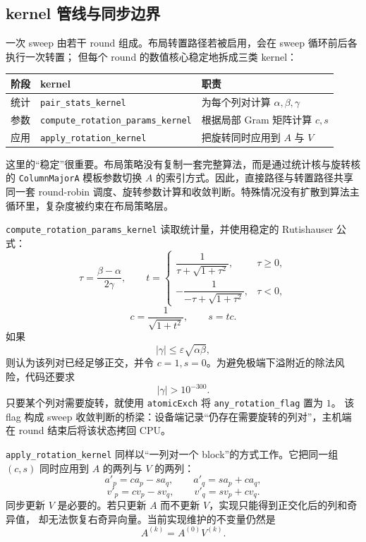 \subsection{kernel 管线与同步边界}

一次 sweep 由若干 round 组成。布局转置路径若被启用，会在 sweep 循环前后各执行一次转置；
但每个 round 的数值核心稳定地拆成三类 kernel：

\begin{table}[htbp]
    \centering
    \begin{tabular}{lll}
        \toprule
        阶段 & kernel                                     & 职责                              \\
        \midrule
        统计 & \texttt{pair\_stats\_kernel}               & 为每个列对计算 \(\alpha,\beta,\gamma\) \\
        参数 & \texttt{compute\_rotation\_params\_kernel} & 根据局部 Gram 矩阵计算 \(c,s\)          \\
        应用 & \texttt{apply\_rotation\_kernel}           & 把旋转同时应用到 \(A\) 与 \(V\)          \\
        \bottomrule
    \end{tabular}
\end{table}

这里的“稳定”很重要。布局策略没有复制一套完整算法，而是通过统计核与旋转核的
\texttt{ColumnMajorA} 模板参数切换 \(A\) 的索引方式。因此，直接路径与转置路径共享同一套
round-robin 调度、旋转参数计算和收敛判断。特殊情况没有扩散到算法主循环里，复杂度被约束在布局策略层。

\texttt{compute\_rotation\_params\_kernel} 读取统计量，并使用稳定的 Rutishauser 公式：
\[
    \tau=\frac{\beta-\alpha}{2\gamma},\qquad
    t =
    \begin{cases}
        \dfrac{1}{\tau+\sqrt{1+\tau^2}},   & \tau\ge0, \\[1.2em]
        -\dfrac{1}{-\tau+\sqrt{1+\tau^2}}, & \tau<0,
    \end{cases}
\]
\[
    c=\frac{1}{\sqrt{1+t^2}},\qquad s=tc.
\]
如果
\[
    |\gamma|\le \varepsilon\sqrt{\alpha\beta},
\]
则认为该列对已经足够正交，并令 \(c=1,s=0\)。为避免极端下溢附近的除法风险，代码还要求
\[
    |\gamma|>10^{-300}.
\]
只要某个列对需要旋转，就使用 \texttt{atomicExch} 将 \texttt{any\_rotation\_flag} 置为 \(1\)。
该 flag 构成 sweep 收敛判断的桥梁：设备端记录“仍存在需要旋转的列对”，主机端在 round 结束后将该状态拷回 CPU。

\texttt{apply\_rotation\_kernel} 同样以“一列对一个 block”的方式工作。它把同一组 \((c,s)\)
同时应用到 \(A\) 的两列与 \(V\) 的两列：
\[
    a'_p = c a_p - s a_q,\qquad
    a'_q = s a_p + c a_q,
\]
\[
    v'_p = c v_p - s v_q,\qquad
    v'_q = s v_p + c v_q.
\]
同步更新 \(V\) 是必要的。若只更新 \(A\) 而不更新 \(V\)，实现只能得到正交化后的列和奇异值，
却无法恢复右奇异向量。当前实现维护的不变量仍然是
\[
    A^{(k)}=A^{(0)}V^{(k)}.
\]


